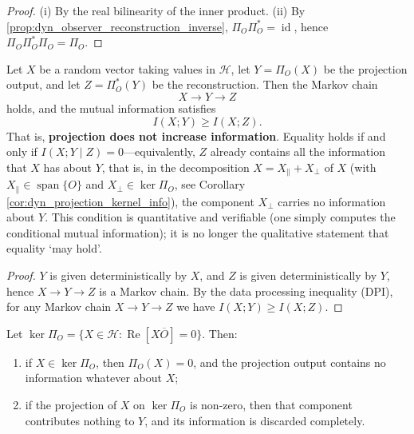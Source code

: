 \begin{proof}
(i) By the real bilinearity of the inner product. (ii) By \cref{prop:dyn_observer_reconstruction_inverse}, $\Pi_O\Pi_O^\ast=\operatorname{id}$, hence $\Pi_O\Pi_O^\ast\Pi_O=\Pi_O$.
\end{proof}

\begin{theorem}\label{thm:dyn_projection_dpi}
Let $X$ be a random vector taking values in $\mathcal H$, let $Y=\Pi_O(X)$ be the projection output, and let $Z=\Pi_O^\ast(Y)$ be the reconstruction. Then the Markov chain
\[
X\longrightarrow Y\longrightarrow Z
\]
holds, and the mutual information satisfies
\[
I(X;Y)\ge I(X;Z).
\]
That is, \textbf{projection does not increase information}. Equality holds if and only if $I(X;Y\mid Z)=0$---equivalently, $Z$ already contains all the information that $X$ has about $Y$, that is, in the decomposition $X=X_\parallel+X_\perp$ of $X$ (with $X_\parallel\in\operatorname{span}\{O\}$ and $X_\perp\in\ker\Pi_O$, see Corollary \ref{cor:dyn_projection_kernel_info}), the component $X_\perp$ carries no information about $Y$. This condition is quantitative and verifiable (one simply computes the conditional mutual information); it is no longer the qualitative statement that equality `may hold'.
\end{theorem}

\begin{proof}
$Y$ is given deterministically by $X$, and $Z$ is given deterministically by $Y$, hence $X\to Y\to Z$ is a Markov chain. By the data processing inequality (DPI), for any Markov chain $X\to Y\to Z$ we have $I(X;Y)\ge I(X;Z)$.
\end{proof}

\begin{corollary}\label{cor:dyn_projection_kernel_info}
Let $\ker\Pi_O=\{X\in\mathcal H:\operatorname{Re}[X\overline O]=0\}$. Then:
\begin{enumerate}[label=(\roman*)]
    \item if $X\in\ker\Pi_O$, then $\Pi_O(X)=0$, and the projection output contains no information whatever about $X$;
    \item if the projection of $X$ on $\ker\Pi_O$ is non-zero, then that component contributes nothing to $Y$, and its information is discarded completely.
\end{enumerate}
\end{corollary}

